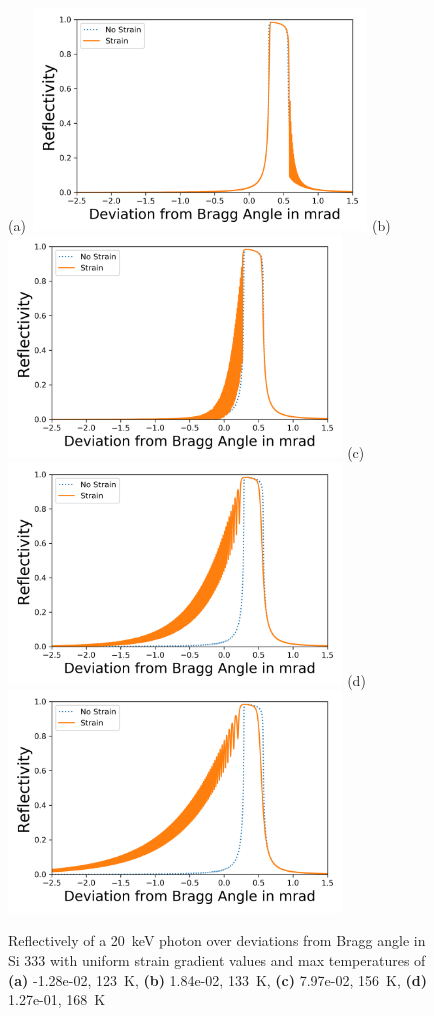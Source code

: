 \documentclass[preprint]{iucr}              %
\begin{document}
\begin{figure}
\caption{Reflectively of a 20~keV photon over deviations from Bragg angle in Si 333 with uniform strain gradient values and max temperatures of \textbf{(a)} -1.28e-02, 123~K, \textbf{(b)} 1.84e-02, 133~K, \textbf{(c)} 7.97e-02, 156~K, \textbf{(d)}  1.27e-01, 168~K}
(a)~\includegraphics[width = 8.85cm]{images/333_20keV_4.png}
(b)~\includegraphics[width = 8.85cm]{images/333_20keV_5.png}
(c)~\includegraphics[width = 8.85cm]{images/333_20keV_7.png}
(d)~\includegraphics[width = 8.85cm]{images/333_20keV_8.png}
\label{fig:333usg20kev}
\end{figure}
\end{document}

